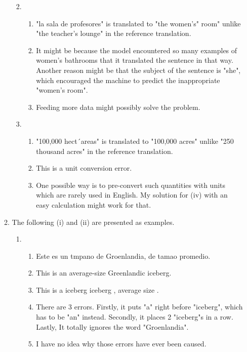 \documentclass[12pt]{article}
\begin{document}
\begin{enumerate}[label=\textbf{\arabic*.}]
\begin{enumerate}[label=(\alph*)]
\begin{enumerate}[label=\roman*.]
\begin{enumerate}[label=\arabic*.]
      \end{enumerate}
      \item
      \begin{enumerate}[label=\arabic*.]
        \item "la sala de profesores" is translated to "the women's" room" unlike "the teacher's lounge" in the reference translation.
        \item It might be because the model encountered so many examples of women's bathrooms that it translated the sentence in that way. Another reason might be that the subject of the sentence is "she", which encouraged the machine to predict the inappropriate "women's room".
        \item Feeding more data might possibly solve the problem.
      \end{enumerate}
      \item
      \begin{enumerate}[label=\arabic*.]
        \item "100,000 hect´areas" is translated to "100,000 acres" unlike "250 thousand acres" in the reference translation.
        \item This is a unit conversion error.
        \item One possible way is to pre-convert such quantities with units which are rarely used in English. My solution for (iv) with an easy calculation might work for that.
      \end{enumerate}
    \end{enumerate}
    \item The following (i) and (ii) are presented as examples.
    \begin{enumerate}[label=\roman*.]
      \item
      \begin{enumerate}[label=\arabic*.]
        \item Este es un tmpano de Groenlandia, de tamao promedio.
        \item This is an average-size Greenlandic iceberg.
        \item This is a iceberg iceberg , average size .
        \item There are 3 errors. Firstly, it puts "a" right before "iceberg", which has to be "an" instead. Secondly, it places 2 "iceberg"s in a row. Lastly, It totally ignores the word "Groenlandia".
        \item I have no idea why those errors have ever been caused.

\end{enumerate}
\end{enumerate}
\end{enumerate}
\end{enumerate}
\end{document}
